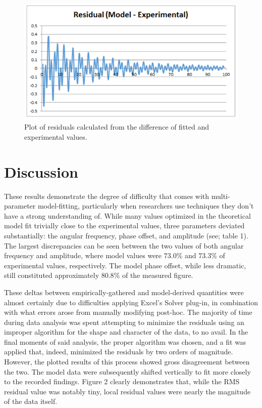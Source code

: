 \documentclass{article}
\begin{document}
  \begin{figure}[!h]
    \centering
    \includegraphics[scale=.6]{Residuals.png}
    \caption{Plot of residuals calculated from the difference of fitted and experimental values.}
    \label{residuals}
  \end{figure}

  \clearpage

  \section{Discussion}

  These results demonstrate the degree of difficulty that comes with multi-parameter model-fitting, particularly when researchers use techniques they don’t have a strong understanding of. While many values optimized in the theoretical model fit trivially close to the experimental values, three parameters deviated substantially: the angular frequency, phase offset, and amplitude (see; table 1). The largest discrepancies can be seen between the two values of both angular frequency and amplitude, where model values were $73.0\%$ and $73.3\%$ of experimental values, respectively. The model phase offset, while less dramatic, still constituted approximately $80.8\%$ of the measured figure.

  These deltas between empirically-gathered and model-derived quantities were almost certainly due to difficulties applying Excel’s Solver plug-in, in combination with what errors arose from manually modifying post-hoc. The majority of time during data analysis was spent attempting to minimize the residuals using an improper algorithm for the shape and character of the data, to no avail. In the final moments of said analysis, the proper algorithm was chosen, and a fit was applied that, indeed, minimized the residuals by two orders of magnitude. However, the plotted results of this process showed gross disagreement between the two. The model data were subsequently shifted vertically to fit more closely to the recorded findings. Figure 2 clearly demonstrates that, while the RMS residual value was notably tiny, local residual values were nearly the magnitude of the data itself.
\end{document}
